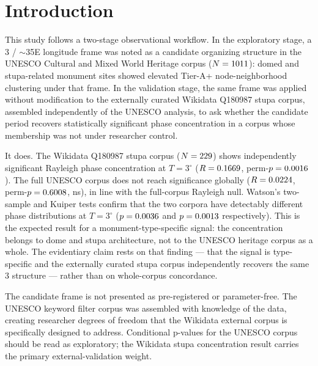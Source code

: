 
\section{Introduction}
\label{sec:introduction}

This study follows a two-stage observational workflow. In the
exploratory stage, a 3\textdegree{} / $\sim$35\textdegree{}E
longitude frame was noted as a candidate organizing structure in the
UNESCO Cultural and Mixed World Heritage corpus ($N = 1011$):
domed and stupa-related monument sites showed elevated Tier-A+
node-neighborhood clustering under that frame. In the validation
stage, the same frame was applied without modification to the
externally curated Wikidata Q180987 stupa corpus, assembled
independently of the UNESCO analysis, to ask whether the candidate
period recovers statistically significant phase concentration in a
corpus whose membership was not under researcher control.

It does. The Wikidata Q180987 stupa corpus ($N = 229{}$) shows
independently significant Rayleigh phase concentration at
$T=3^\circ$ ($R = 0.1669{}$, perm-$p = 0.0016{}$).
The full UNESCO corpus does not reach significance globally
($R = 0.0224{}$, perm-$p = 0.6008{}$, ns), in
line with the full-corpus Rayleigh null. Watson's two-sample and
Kuiper tests confirm that the two corpora have detectably different
phase distributions at $T=3^\circ$ ($p=0.0036{}$ and
$p=0.0013{}$ respectively). This is the expected
result for a monument-type-specific signal: the concentration belongs
to dome and stupa architecture, not to the UNESCO heritage corpus as a
whole. The evidentiary claim rests on that finding --- that the signal
is type-specific and the externally curated stupa corpus independently
recovers the same 3\textdegree{} structure --- rather than on
whole-corpus concordance.

The candidate frame is not presented as pre-registered or
parameter-free. The UNESCO keyword filter corpus was assembled with
knowledge of the data, creating researcher degrees of freedom that
the Wikidata external corpus is specifically designed to address.
Conditional p-values for the UNESCO corpus should be read as
exploratory; the Wikidata stupa concentration result carries the
primary external-validation weight.

